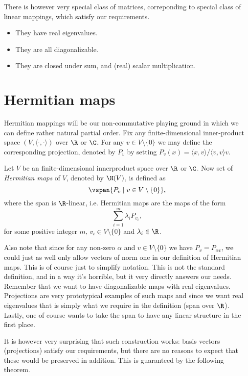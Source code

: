 There is however very special class of matrices, correponding to special class of linear mappings, which satisfy our requirements.
\begin{itemize}
	\item They have real eigenvalues.
	\item They are all diagonalizable.
	\item They are closed under sum, and (real) scalar multiplication.
\end{itemize}

\section{Hermitian maps}

Hermitian mappings will be our non-commutative playing ground in which we can define rather natural partial order. Fix any finite-dimensional inner-product space $(V, \langle \cdot, \cdot \rangle )$ over $\R$ or $\C$. For any $v \in V \setminus \{0\}$ we may define the corresponding projection, denoted by $P_{v}$ by setting $P_{v}(x) = \langle x , v \rangle /\langle v, v \rangle v$.

\begin{maar}
	Let $V$ be an finite-dimensional innerproduct space over $\R$ or $\C$. Now set of \textit{Hermitian maps} of $V$, denoted by $\H(V)$, is defined as
	\[
		\vspan \{P_{v} \mid v \in V \setminus \{0\}\},
	\]
	where the span is $\R$-linear, i.e. Hermitian maps are the maps of the form
	\[
		\sum_{i = 1}^{m} \lambda_{i} P_{v_{i}},
	\]
	for some positive integer $m$, $v_{i} \in V \setminus \{0\}$ and $\lambda_{i} \in \R$.
\end{maar}

Also note that since for any non-zero $\alpha$ and $v \in V \setminus \{0\}$ we have $P_{v} = P_{\alpha v}$, we could just as well only allow vectors of norm one in our definition of Hermitian maps. This is of course just to simplify notation. This is not the standard definition, and in a way it's horrible, but it very directly answers our needs. Remember that we want to have diagonalizable maps with real eigenvalues. Projections are very prototypical examples of such maps and since we want real eigenvalues that is simply what we require in the definition (span over $\R$). Lastly, one of course wants to take the span to have any linear structure in the first place.

It is however very surprising that such construction works: basis vectors (projections) satisfy our requirements, but there are no reasons to expect that these would be preserved in addition. This is guaranteed by the following theorem.

